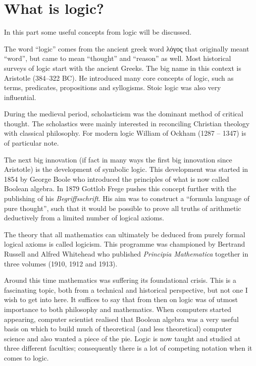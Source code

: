 \chapter{What is logic?}
In this part some useful concepts from logic will be discussed.

The word ``logic'' comes from the ancient greek word \textgreek{λόγος} that originally meant ``word'', but came to mean ``thought'' and ``reason'' as well. Most historical surveys of logic start with the ancient Greeks. The big name in this context is Aristotle (384–322 BC). He introduced many core concepts of logic, such as terms, predicates, propositions and syllogisms. Stoic logic was also very influential.

During the medieval period, scholasticism was the dominant method of critical thought. The scholastics were mainly interested in reconciling Christian theology with classical philosophy. For modern logic William of Ockham (1287 – 1347) is of particular note.

The next big innovation (if fact in many ways the first big innovation since Aristotle) is the development of symbolic logic. This development was started in 1854 by George Boole who introduced the principles of what is now called Boolean algebra. In 1879 Gottlob Frege pushes this concept further with the publishing of his \textit{Begriffsschrift}. His aim was to construct a ``formula language of pure thought'', such that it would be possible to prove all truths of arithmetic deductively from a limited number of logical axioms.

The theory that all mathematics can ultimately be deduced from purely formal logical axioms is called logicism. This programme was championed by Bertrand Russell and Alfred Whitehead who published \textit{Principia Mathematica} together in three volumes (1910, 1912 and 1913). 

Around this time mathematics was suffering its foundational crisis. This is a fascinating topic, both from a technical and historical perspective, but not one I wish to get into here. It suffices to say that from then on logic was of utmost importance to both philosophy and mathematics. When computers started appearing, computer scientist realised that Boolean algebra was a very useful basis on which to build much of theoretical (and less theoretical) computer science and also wanted a piece of the pie. Logic is now taught and studied at three different faculties; consequently there is a lot of competing notation when it comes to logic.

